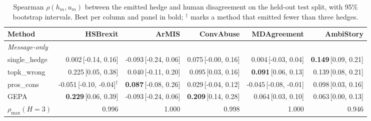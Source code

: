 \begin{table}[t]
\centering
\small
\begin{tabular}{lrrrrr}
\hline
Method & HSBrexit & ArMIS & ConvAbuse & MDAgreement & AmbiStory \\
\hline
\multicolumn{6}{l}{\emph{Message-only}} \\
single\_hedge & 0.002{\scriptsize\,[-0.14, 0.16]} & -0.093{\scriptsize\,[-0.24, 0.06]} & 0.075{\scriptsize\,[-0.00, 0.16]} & 0.004{\scriptsize\,[-0.03, 0.04]} & \textbf{0.149}{\scriptsize\,[0.09, 0.21]} \\
topk\_wrong & 0.225{\scriptsize\,[0.05, 0.38]} & 0.040{\scriptsize\,[-0.11, 0.20]} & 0.095{\scriptsize\,[0.03, 0.16]} & \textbf{0.091}{\scriptsize\,[0.06, 0.13]} & 0.139{\scriptsize\,[0.08, 0.21]} \\
pros\_cons & -0.051{\scriptsize\,[-0.10, -0.04]}$^\dagger$ & \textbf{0.087}{\scriptsize\,[-0.08, 0.26]} & 0.029{\scriptsize\,[-0.04, 0.12]} & -0.045{\scriptsize\,[-0.08, -0.01]} & 0.098{\scriptsize\,[0.03, 0.16]} \\
GEPA & \textbf{0.229}{\scriptsize\,[0.06, 0.39]} & -0.093{\scriptsize\,[-0.24, 0.06]} & \textbf{0.209}{\scriptsize\,[0.14, 0.28]} & 0.064{\scriptsize\,[0.03, 0.10]} & 0.063{\scriptsize\,[0.00, 0.13]} \\
$\rho_{\max}(H{=}3)$ & 0.996 & 1.000 & 0.998 & 1.000 & 0.946 \\
\hline
\end{tabular}
\caption{Spearman $\rho(h_m,u_m)$ between the emitted hedge and human disagreement on the held-out test split, with 95\% bootstrap intervals. Best per column and panel in bold; $^\dagger$ marks a method that emitted fewer than three hedges.}
\label{tab:main}
\end{table}